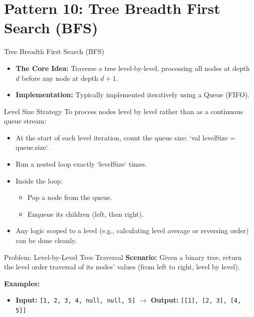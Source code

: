 \section{Pattern 10: Tree Breadth First Search (BFS)}

\begin{frame}[c]{\empty}
    \begin{center}
        \Large\textbf{\secname}
    \end{center}
\end{frame}

\begin{frame}{Tree Breadth First Search (BFS)}
  \begin{itemize}
    \item \textbf{The Core Idea:} Traverse a tree level-by-level, processing all nodes at depth $d$ before any node at depth $d+1$.
    \item \textbf{Implementation:} Typically implemented iteratively using a Queue (FIFO).
  \end{itemize}
\end{frame}

\begin{frame}{Level Size Strategy}
  To process nodes level by level rather than as a continuous queue stream:
  \begin{itemize}
    \item At the start of each level iteration, count the queue size: `val levelSize = queue.size`.
    \item Run a nested loop exactly `levelSize` times.
    \item Inside the loop:
      \begin{itemize}
        \item Pop a node from the queue.
        \item Enqueue its children (left, then right).
      \end{itemize}
    \item Any logic scoped to a level (e.g., calculating level average or reversing order) can be done cleanly.
  \end{itemize}
\end{frame}

\begin{frame}[fragile]{Problem: Level-by-Level Tree Traversal}
  \textbf{Scenario:}
  Given a binary tree, return the level order traversal of its nodes' values (from left to right, level by level).
  
  \vspace{0.3cm}
  \textbf{Examples:}
  \begin{itemize}
    \item \textbf{Input:} \texttt{[1, 2, 3, 4, null, null, 5]} $\rightarrow$ \textbf{Output:} \texttt{[[1], [2, 3], [4, 5]]}
  \end{itemize}
\end{frame}

